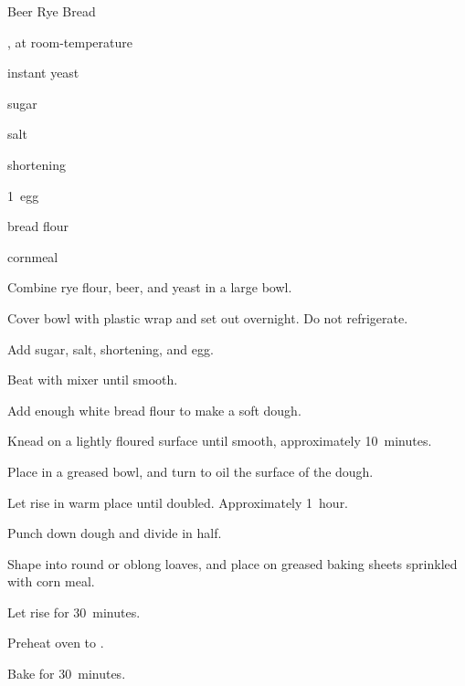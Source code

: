 \begin{recipe}{Beer Rye Bread}{}{}

\begin{ingredients}
\item {} 
\item \C{1\half} , at room-temperature
\item \tp{4\half} instant yeast
\item {} sugar
\item {} salt
\item {} shortening
\item 1~egg
\item {} bread flour
\item {} cornmeal
\end{ingredients}

\begin{directions}
\item Combine rye flour, beer, and yeast in a large bowl.
\item Cover bowl with plastic wrap and set out overnight. Do not refrigerate.
\item Add sugar, salt, shortening, and egg.
\item Beat with mixer until smooth.
\item Add enough white bread flour to make a soft dough.
\item Knead on a lightly floured surface until smooth, approximately 10~minutes.
\item Place in a greased bowl, and turn to oil the surface of the dough.
\item Let rise in warm place until doubled. Approximately 1~hour.
\item Punch down dough and divide in half.
\item Shape into round or oblong loaves, and place on greased baking sheets sprinkled with corn meal.
\item Let rise for 30~minutes.
\item Preheat oven to .
\item Bake for 30~minutes.
\end{directions}

\end{recipe}
